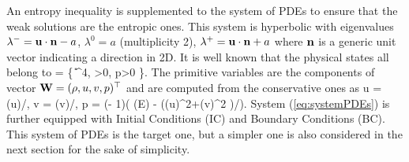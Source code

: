 An entropy inequality is supplemented to the system of PDEs to ensure that the weak solutions are the entropic ones.
This system is hyperbolic with eigenvalues $\lambda^-=\mathbf{u}\cdot\mathbf{n} - a$, $\lambda^0=a$ (multiplicity 2), $\lambda^+=\mathbf{u}\cdot\mathbf{n} + a$ where $\mathbf{n}$ is a generic unit vector indicating a direction in 2D. 
It is well known that the physical states all belong to 
\bea \label{eq:physical_states}
     = \left\{ \U\in {}^4, \;  \; \rho>0, \; p>0 \right\}.
\eea
The primitive variables are the components of vector $\mathbf{W}=( \rho, u,v, p )^\top$ and are computed from the conservative ones as 
\bea
    u = (\rho u)/\rho, \qquad
    v = (\rho v)/\rho, \qquad
    p = (\gamma - 1)\left( (\rho E) -  \left((\rho u)^2+(\rho v)^2 \right)/\rho \right).
\eea
System (\ref{eq:systemPDEs}) is further equipped with Initial Conditions (IC) and Boundary Conditions (BC). 
This system of PDEs is the target one, but a simpler one is also considered in the next section for the sake of simplicity.


